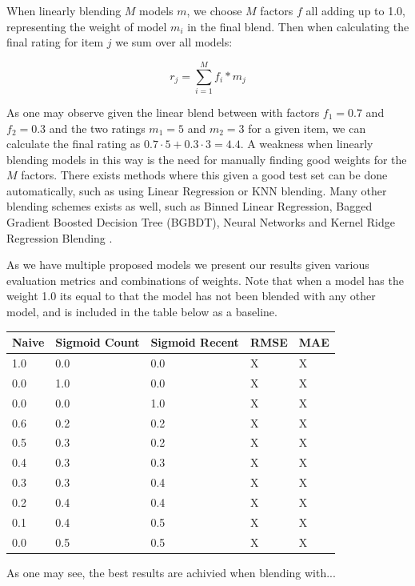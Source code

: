 When linearly blending $M$ models $m$, we choose $M$ factors $f$ all adding up
to 1.0, representing the weight of model $m_{i}$ in the final blend. Then when
calculating the final rating for item $j$ we sum over all models:

\begin{equation}
  r_j = \sum _{i=1}^{M} f_{i} * m_{j}
\end{equation}

As one may observe given the linear blend between with factors $f_1 = 0.7$ and
$f_2 = 0.3$ and the two ratings $m_1 = 5$ and $m_2 = 3$ for a given item, we
can calculate the final rating as $0.7 \cdot 5 + 0.3 \cdot 3 = 4.4$. A weakness
when linearly blending models in this way is the need for manually finding good
weights for the $M$ factors. There exists methods where this given a good test
set can be done automatically, such as using Linear Regression or KNN blending.
Many other blending schemes exists as well, such as Binned Linear Regression,
Bagged Gradient Boosted Decision Tree (BGBDT), Neural Networks and Kernel Ridge
Regression Blending \cite{jahrer2010combining} \cite{toscher2009bigchaos}.

As we have multiple proposed models we present our results given various
evaluation metrics and combinations of weights. Note that when a model has the
weight 1.0 its equal to that the model has not been blended with any other
model, and is included in the table below as a baseline.

\begin{table}[H]
  \centering
  \begin{tabular}{lll|ll}
    \toprule
    \textbf{Naive} &  \textbf{Sigmoid Count} & \textbf{Sigmoid Recent} &
    \textbf{RMSE} & \textbf{MAE} \\
    \midrule
    1.0  &      0.0        &      0.0       &  X   &  X  \\
    0.0  &      1.0        &      0.0       &  X   &  X  \\
    0.0  &      0.0        &      1.0       &  X   &  X  \\
    \midrule
    0.6  &      0.2        &      0.2       &  X   &  X  \\
    0.5  &      0.3        &      0.2       &  X   &  X  \\
    0.4  &      0.3        &      0.3       &  X   &  X  \\
    0.3  &      0.3        &      0.4       &  X   &  X  \\
    0.2  &      0.4        &      0.4       &  X   &  X  \\
    0.1  &      0.4        &      0.5       &  X   &  X  \\
    0.0  &      0.5        &      0.5       &  X   &  X  \\
    \bottomrule
  \end{tabular}
\end{table}

As one may see, the best results are achivied when blending with...
